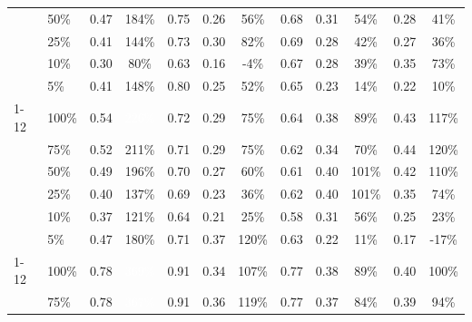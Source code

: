 \begin{longtable}{llcccccccccc}
 & 50\% & 0.47 & \cellcolor{tablegreen!52}184\% & 0.75 & 0.26 & \cellcolor{tablegreen!16}56\% & 0.68 & 0.31 & \cellcolor{tablegreen!15}54\% & 0.28 & \cellcolor{tablegreen!12}41\% \\
 & 25\% & 0.41 & \cellcolor{tablegreen!41}144\% & 0.73 & 0.30 & \cellcolor{tablegreen!24}82\% & 0.69 & 0.28 & \cellcolor{tablegreen!12}42\% & 0.27 & \cellcolor{tablegreen!10}36\% \\
 & 10\% & 0.30 & \cellcolor{tablegreen!23}80\% & 0.63 & 0.16 & \cellcolor[HTML]{E8A0A0}-4\% & 0.67 & 0.28 & \cellcolor{tablegreen!11}39\% & 0.35 & \cellcolor{tablegreen!21}73\% \\
 & 5\% & 0.41 & \cellcolor{tablegreen!42}148\% & 0.80 & 0.25 & \cellcolor{tablegreen!15}52\% & 0.65 & 0.23 & \cellcolor{tablegreen!4}14\% & 0.22 & \cellcolor{tablegreen!3}10\% \\
\cmidrule(l){1-12}
\multirow{6}{*}{qwen} & 100\% & 0.54 & \cellcolor{tablegreen!64}\textcolor{white}{226\%} & 0.72 & 0.29 & \cellcolor{tablegreen!21}75\% & 0.64 & 0.38 & \cellcolor{tablegreen!26}89\% & 0.43 & \cellcolor{tablegreen!33}117\% \\
 & 75\% & 0.52 & \cellcolor{tablegreen!60}211\% & 0.71 & 0.29 & \cellcolor{tablegreen!21}75\% & 0.62 & 0.34 & \cellcolor{tablegreen!20}70\% & 0.44 & \cellcolor{tablegreen!34}120\% \\
 & 50\% & 0.49 & \cellcolor{tablegreen!56}196\% & 0.70 & 0.27 & \cellcolor{tablegreen!17}60\% & 0.61 & 0.40 & \cellcolor{tablegreen!29}101\% & 0.42 & \cellcolor{tablegreen!31}110\% \\
 & 25\% & 0.40 & \cellcolor{tablegreen!39}137\% & 0.69 & 0.23 & \cellcolor{tablegreen!10}36\% & 0.62 & 0.40 & \cellcolor{tablegreen!29}101\% & 0.35 & \cellcolor{tablegreen!21}74\% \\
 & 10\% & 0.37 & \cellcolor{tablegreen!35}121\% & 0.64 & 0.21 & \cellcolor{tablegreen!7}25\% & 0.58 & 0.31 & \cellcolor{tablegreen!16}56\% & 0.25 & \cellcolor{tablegreen!7}23\% \\
 & 5\% & 0.47 & \cellcolor{tablegreen!52}180\% & 0.71 & 0.37 & \cellcolor{tablegreen!34}120\% & 0.63 & 0.22 & \cellcolor{tablegreen!3}11\% & 0.17 & \cellcolor[HTML]{E8A0A0}-17\% \\
\cmidrule(l){1-12}
\multirow{6}{*}{granite} & 100\% & 0.78 & \cellcolor{tablegreen!100}\textcolor{white}{369\%} & 0.91 & 0.34 & \cellcolor{tablegreen!31}107\% & 0.77 & 0.38 & \cellcolor{tablegreen!25}89\% & 0.40 & \cellcolor{tablegreen!29}100\% \\
 & 75\% & 0.78 & \cellcolor{tablegreen!100}\textcolor{white}{367\%} & 0.91 & 0.36 & \cellcolor{tablegreen!34}119\% & 0.77 & 0.37 & \cellcolor{tablegreen!24}84\% & 0.39 & \cellcolor{tablegreen!27}94\% \\

\end{longtable}
